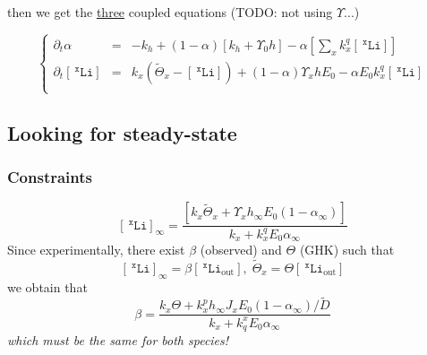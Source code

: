 \documentclass[aps,onecolumn,12pt]{revtex4}
\newcommand{\mychem}[1]{\mathtt{#1}}
\newcommand{\myconc}[1]{\left\lbrack{#1}\right\rbrack}
\newcommand{\spLi}[1]{{~^{\mychem{#1}}\mychem{Li}}}
\newcommand{\Li}[1]{\myconc{\spLi{#1}}}
\newcommand{\spLiOut}[1]{{\spLi{#1}}_{\mathrm{out}}}
\newcommand{\LiOut}[1]{\myconc{\spLiOut{#1}}}
\newcommand{\spproton}{\mychem{H}}
\newcommand{\proton}{\myconc{\spproton}}
\begin{document}
%


then we get the \underline{three} coupled equations (TODO: not using $\Upsilon...$)

\begin{equation}
\boxed{
\left\lbrace
	\begin{array}{rcl}
		\partial_t\alpha & = & -k_h + \left(1- \alpha\right)\left\lbrack k_h+\Upsilon_0 h\right] - \alpha \left\lbrack {\sum_x k_x^q \Li{x}} \right\rbrack\\
		\partial_t\Li{x} & = & k_x \left(\tilde{\Theta}_x -\Li{x} \right)  + \left(1-\alpha\right) \Upsilon_x h  E_0 - \alpha E_0 k_x^q \Li{x}\\
	\end{array}
\right.
}
\end{equation}


\subsection{Looking for steady-state}
\subsubsection{Constraints}
\begin{equation}
	\Li{x}_\infty = \dfrac{\left\lbrack k_x\tilde{\Theta}_x+\Upsilon_x h_\infty E_0 \left(1-\alpha_\infty\right)\right\rbrack}{k_x+ k_x^q E_0\alpha_\infty}
\end{equation}
Since experimentally, there exist ${\beta}$ (observed) and $\Theta$ (GHK) such that
\begin{equation}
	\Li{x}_\infty=\beta\LiOut{x},\;\tilde{\Theta}_x = \Theta \LiOut{x}
\end{equation}
we obtain that
\begin{equation}
		\beta = \dfrac{k_x\Theta + k_x^p h_\infty {J_x} E_0 (1-\alpha_\infty)/\tilde{D}}{k_x+ k_q^x E_0\alpha_\infty}
\end{equation}
\textit{which must be the same for both species!}
\end{document}
